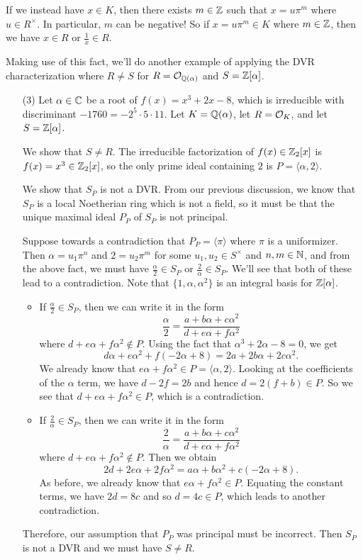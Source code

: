 If we instead have $x \in K$, then there exists $m \in \mathbb{Z}$ such that 
$x = u\pi^m$ where $u \in R^\times$. In particular, $m$ can be negative! 
So if $x = u\pi^m \in K$ where $m \in \mathbb{Z}$, then we have $x \in R$ 
or $\frac{1}{x} \in R$. 

Making use of this fact, we'll do another example of applying the DVR characterization 
where $R \neq S$ for $R = {\cal O}_{\mathbb{Q}(\alpha)}$ and $S = \mathbb{Z}[\alpha]$. 
\begin{enumerate}
    \item [(3)] Let $\alpha \in \mathbb{C}$ be a root of $f(x) = x^3 + 2x - 8$, which 
    is irreducible with discriminant $-1760 = -2^5 \cdot 5 \cdot 11$. 
    Let $K = \mathbb{Q}(\alpha)$, let $R = {\cal O}_K$, and let $S = \mathbb{Z}[\alpha]$. 

    We show that $S \neq R$. The irreducible factorization of $f(x) 
    \in \mathbb{Z}_2[x]$ is $f(x) = x^3 \in \mathbb{Z}_2[x]$, so the only prime ideal 
    containing $2$ is $P = \langle \alpha, 2 \rangle$. 

    We show that $S_P$ is not a DVR. From our previous discussion, 
    we know that $S_P$ is a local Noetherian ring which is not a field, so 
    it must be that the unique maximal ideal $P_P$ of $S_P$ is not principal.
    
    Suppose towards a contradiction that $P_P = \langle \pi \rangle$ 
    where $\pi$ is a uniformizer. Then $\alpha = u_1 \pi^n$ and 
    $2 = u_2 \pi^m$ for some $u_1, u_2 \in S^\times$ and $n, m \in \mathbb{N}$, 
    and from the above fact, we must have $\frac{\alpha}{2} \in S_P$ or 
    $\frac{2}{\alpha} \in S_P$. We'll see that both of these lead to a 
    contradiction. Note that $\{1, \alpha, \alpha^2\}$ is an integral 
    basis for $\mathbb{Z}[\alpha]$.
    \begin{itemize}
        \item If $\frac{\alpha}{2} \in S_P$, then we can write it in the form
        \[ \frac{\alpha}{2} = \frac{a + b\alpha + c\alpha^2}{d + e\alpha + f\alpha^2} \] 
        where $d + e\alpha + f\alpha^2 \notin P$. Using the fact that 
        $\alpha^3 + 2\alpha - 8 = 0$, we get 
        \[ d\alpha + e\alpha^2 + f(-2\alpha + 8) = 2a + 2b\alpha + 2c\alpha^2. \] 
        We already know that $e\alpha + f\alpha^2 \in P = \langle \alpha, 2 \rangle$. 
        Looking at the coefficients of the $\alpha$ term, we have 
        $d - 2f = 2b$ and hence $d = 2(f + b) \in P$. So we see that 
        $d + e\alpha + f\alpha^2 \in P$, which is a contradiction. 
        \item If $\frac{2}{\alpha} \in S_P$, then we can write it in the form 
        \[ \frac{2}{\alpha} = \frac{a + b\alpha + c\alpha^2}{d + e\alpha + f\alpha^2} \]
        where $d + e\alpha + f\alpha^2 \notin P$. Then we obtain 
        \[ 2d + 2e\alpha + 2f\alpha^2 = a\alpha + b\alpha^2 + c(-2\alpha + 8). \] 
        As before, we already know that $e\alpha + f\alpha^2 \in P$. 
        Equating the constant terms, we have $2d = 8c$ and so $d = 4c \in P$, 
        which leads to another contradiction. 
    \end{itemize}
    Therefore, our assumption that $P_P$ was principal must be incorrect. 
    Then $S_P$ is not a DVR and we must have $S \neq R$.
\end{enumerate}
